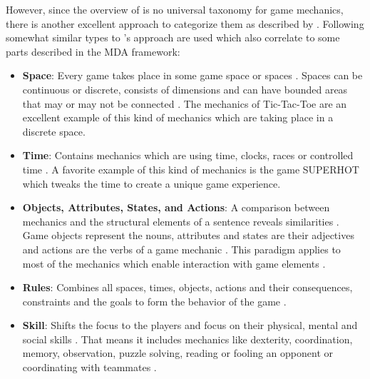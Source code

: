 \documentclass[MGS,Master,english]{twbook}%
\begin{document}
However, since the overview of \citep{gameDesign::gameMechanicsAdvancedGameDesign} is no universal taxonomy for game mechanics, there is another excellent approach to categorize them as described by \cite{gameDesign::bookOfLenses}. Following somewhat similar types to 's approach are used which also correlate to some parts described in the MDA framework:
\begin{itemize}
	\item \textbf{Space}: Every game takes place in some game space or spaces \cite{gameDesign::bookOfLenses}. Spaces can be continuous or discrete, consists of dimensions and can have bounded areas that may or may not be connected \cite{gameDesign::bookOfLenses}. The mechanics of Tic-Tac-Toe are an excellent example of this kind of mechanics which are taking place in a discrete space. 
	\item \textbf{Time}: Contains mechanics which are using time, clocks, races or controlled time \cite{gameDesign::bookOfLenses}. A favorite example of this kind of mechanics is the game SUPERHOT \cite{game::superhot} which tweaks the time to create a unique game experience.
	\item \textbf{Objects, Attributes, States, and Actions}: A comparison between mechanics and the structural elements of a sentence reveals similarities \cite{gameDesign::bookOfLenses}. Game objects represent the nouns, attributes and states are their adjectives and actions are the verbs of a game mechanic \cite{gameDesign::bookOfLenses}. This paradigm applies to most of the mechanics which enable interaction with game elements \cite{gameDesign::bookOfLenses}. 
	\item \textbf{Rules}: Combines all spaces, times, objects, actions and their consequences, constraints and the goals to form the behavior of the game \cite{gameDesign::bookOfLenses}. 
	\item \textbf{Skill}: Shifts the focus to the players and focus on their physical, mental and social skills \cite{gameDesign::bookOfLenses}. That means it includes mechanics like dexterity, coordination, memory, observation, puzzle solving, reading or fooling an opponent or coordinating with teammates \cite{gameDesign::bookOfLenses}.  
\end{itemize}

\end{document}
